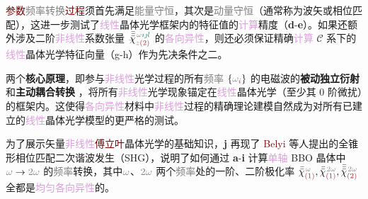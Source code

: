 \textcolor{Maroon}{参数}\textcolor{gray}{频率转换}\textcolor{Maroon}{过程}须首先满足\textcolor{gray}{能量守恒}，其次是\textcolor{gray}{动量守恒}（通常称为\textcolor{PineGreen}{波矢}或\textcolor{PineGreen}{相位匹配}），这进一步测试了\textcolor{Plum}{线性}\textcolor{PineGreen}{晶体光学}框架内的\textcolor{PineGreen}{特征值}的\textcolor{Plum}{计算}精度（\textbf{d}-\textbf{e}）。如果还额外涉及二阶\textcolor{Plum}{非线性}系数张量 $\Xint{{}^{}_{\mathcolor{gray}{-}}}{23}{\bar{\bar{\bar{\chi}}}}^{\;\! \mathcolor{gray}{\omega} \textcolor{PineGreen}{\imath \jmath l}}_{\mathcolor{gray}{z} \textcolor{Maroon}{(2)}}$ 的\textcolor{Plum}{各向异性}，则还必须保证精确\textcolor{Plum}{计算} \textcolor{PineGreen}{$\mathcal{C}$ 系}下\cite{midwinterEffectsPhaseMatching1965,yaoAccurateCalculationOptimum1992,dmitrievEffectiveNonlinearityCoefficients1993,diesperovEffectiveNonlinearCoefficient1997}的\textcolor{Plum}{线性}\textcolor{PineGreen}{晶体光学}\textcolor{PineGreen}{特征向量}（g-h）作为先决条件之二。

两个\textbf{核心原理}，即参与\textcolor{Plum}{非线性}\textcolor{NavyBlue}{光学}过程的所有\textcolor{gray}{频率} $\{ \mathcolor{gray}{\omega}_{\textcolor{Maroon}{i}} \}$ 的电磁波的\textbf{被动独立衍射}   和\textbf{主动耦合转换}  ，将所有\textcolor{Plum}{非线性}\textcolor{NavyBlue}{光学}现象锚定在\textcolor{Plum}{线性}\textcolor{PineGreen}{晶体光学}（至少其 \textcolor{NavyBlue}{0 阶微扰}）的框架内。这使得\textcolor{Plum}{各向异性}材料中\textcolor{Plum}{非线性}过程的精确\textcolor{NavyBlue}{理论建模}自然成为对所有已建立的\textcolor{Plum}{线性}\textcolor{PineGreen}{晶体光学}模型的更严格的测试。

为了展示矢量\textcolor{Plum}{非线性}\textcolor{Maroon}{傅立叶}\textcolor{PineGreen}{晶体光学}的基础知识，\textbf{j} 再现了 \textcolor{Maroon}{Belyi} 等人\cite{belyiPropagationHighorderCircularly2011}提出的\textcolor{PineGreen}{全锥形相位匹配}二次谐波发生（SHG），说明了如何通过 \textbf{a}-\textbf{i} 计算\textcolor{Plum}{单轴} BBO 晶体中 $\mathcolor{gray}{\omega} \to \mathcolor{gray}{2\omega}$ 的\textcolor{gray}{频率}转换，其中$\mathcolor{gray}{\omega}$、$\mathcolor{gray}{2\omega}$ 两个\textcolor{gray}{频率}处的一阶、二阶极化率 $\bar{\bar{\chi}}^{\;\! \mathcolor{gray}{\omega}}_{ \textcolor{Maroon}{(1)}},\bar{\bar{\chi}}^{\;\! \mathcolor{gray}{2\omega}}_{ \textcolor{Maroon}{(1)}},\bar{\bar{\bar{\chi}}}^{\;\! \mathcolor{gray}{2\omega}}_{ \textcolor{Maroon}{(2)}}$ 全都是\textcolor{Plum}{均匀}\textcolor{Plum}{各向异性}的。

